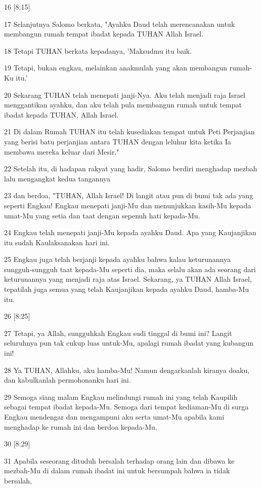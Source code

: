 \par 16 [8:15]
\par 17 Selanjutnya Salomo berkata, "Ayahku Daud telah merencanakan untuk membangun rumah tempat ibadat kepada TUHAN Allah Israel.
\par 18 Tetapi TUHAN berkata kepadanya, 'Maksudmu itu baik.
\par 19 Tetapi, bukan engkau, melainkan anakmulah yang akan membangun rumah-Ku itu.'
\par 20 Sekarang TUHAN telah menepati janji-Nya. Aku telah menjadi raja Israel menggantikan ayahku, dan aku telah pula membangun rumah untuk tempat ibadat kepada TUHAN, Allah Israel.
\par 21 Di dalam Rumah TUHAN itu telah kusediakan tempat untuk Peti Perjanjian yang berisi batu perjanjian antara TUHAN dengan leluhur kita ketika Ia membawa mereka keluar dari Mesir."
\par 22 Setelah itu, di hadapan rakyat yang hadir, Salomo berdiri menghadap mezbah lalu mengangkat kedua tangannya
\par 23 dan berdoa, "TUHAN, Allah Israel! Di langit atau pun di bumi tak ada yang seperti Engkau! Engkau menepati janji-Mu dan menunjukkan kasih-Mu kepada umat-Mu yang setia dan taat dengan sepenuh hati kepada-Mu.
\par 24 Engkau telah menepati janji-Mu kepada ayahku Daud. Apa yang Kaujanjikan itu sudah Kaulaksanakan hari ini.
\par 25 Engkau juga telah berjanji kepada ayahku bahwa kalau keturunannya sungguh-sungguh taat kepada-Mu seperti dia, maka selalu akan ada seorang dari keturunannya yang menjadi raja atas Israel. Sekarang, ya TUHAN Allah Israel, tepatilah juga semua yang telah Kaujanjikan kepada ayahku Daud, hamba-Mu itu.
\par 26 [8:25]
\par 27 Tetapi, ya Allah, sungguhkah Engkau sudi tinggal di bumi ini? Langit seluruhnya pun tak cukup luas untuk-Mu, apalagi rumah ibadat yang kubangun ini!
\par 28 Ya TUHAN, Allahku, aku hamba-Mu! Namun dengarkanlah kiranya doaku, dan kabulkanlah permohonanku hari ini.
\par 29 Semoga siang malam Engkau melindungi rumah ini yang telah Kaupilih sebagai tempat ibadat kepada-Mu. Semoga dari tempat kediaman-Mu di surga Engkau mendengar dan mengampuni aku serta umat-Mu apabila kami menghadap ke rumah ini dan berdoa kepada-Mu.
\par 30 [8:29]
\par 31 Apabila seseorang dituduh bersalah terhadap orang lain dan dibawa ke mezbah-Mu di dalam rumah ibadat ini untuk bersumpah bahwa ia tidak bersalah,
